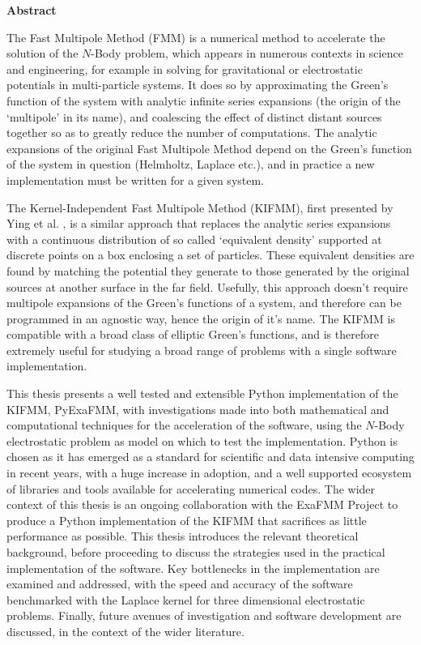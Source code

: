 \thispagestyle{plain}

\begin{center}
    \textbf{Abstract}
\end{center}

The Fast Multipole Method (\gls{FMM}) is a numerical method to accelerate the solution
of the $N$-Body problem, which appears in numerous contexts in science and engineering,
for example in solving for gravitational or electrostatic potentials in multi-particle
systems. It does so by approximating the Green's function of the
system with analytic infinite series expansions (the origin of the `multipole' in its name),
and coalescing the effect of distinct distant sources together so as to
greatly reduce the number of computations. The analytic expansions of the
original Fast Multipole Method depend on the Green's function of the system in
question (Helmholtz, Laplace etc.), and in practice a new implementation
must be written for a given system.

The Kernel-Independent Fast Multipole Method (\gls{KIFMM}),
first presented by Ying et al. \cite{Ying:2004:JCP}, is a similar approach that replaces
the analytic series expansions with a continuous distribution of so called
`equivalent density' supported at discrete points on a box enclosing a set of
particles. These equivalent densities are found by matching the potential they
generate to those generated by the original sources at another surface in the
far field. Usefully, this approach doesn't require multipole expansions of the
Green's functions of a system, and therefore can be programmed in an agnostic way,
hence the origin of it's name. The KIFMM is compatible with a broad class of
elliptic Green's functions, and is therefore extremely useful for studying a broad
range of problems with a single software implementation.

This thesis presents a well tested and extensible Python implementation of the KIFMM, \gls{PyExaFMM},
with investigations made into both mathematical and computational
techniques for the acceleration of the software, using the $N$-Body electrostatic
problem as model on which to test the implementation. Python is chosen as it has emerged as a standard
for scientific and data intensive computing in recent years, with a huge increase
in adoption, and a well supported ecosystem of libraries and tools available for
accelerating numerical codes. The wider context of this thesis
is an ongoing collaboration with the ExaFMM Project \cite{exafmm} to produce a Python
implementation of the KIFMM that sacrifices as little performance as possible.
This thesis introduces the relevant theoretical background, before
proceeding to discuss the strategies used in the practical implementation of the
software. Key bottlenecks in the implementation are examined and addressed, with the speed
and accuracy of the software benchmarked with the Laplace kernel for three dimensional
electrostatic problems. Finally, future avenues of investigation and software
development are discussed, in the context of the wider literature.
